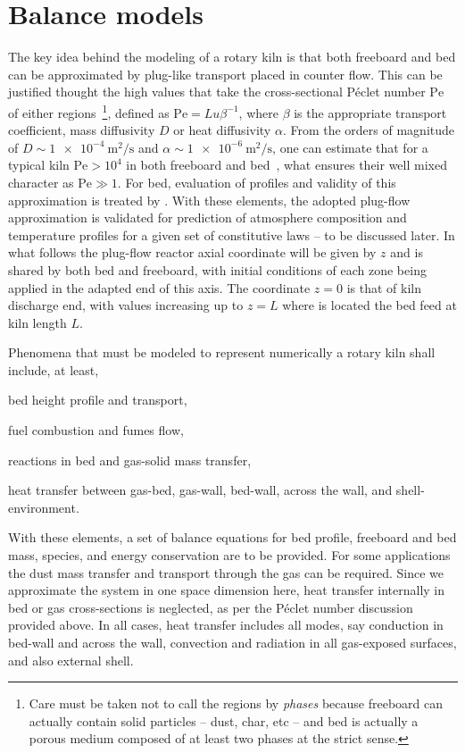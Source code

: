 \documentclass[11pt]{paper}
\begin{document}
\section{Balance models}

The key idea behind the modeling of a rotary kiln is that both freeboard and bed can be approximated by plug-like transport placed in counter flow. This can be justified thought the high values that take the cross-sectional Péclet number $\mathrm{Pe}$ of either regions~\footnote{Care must be taken not to call the regions by \emph{phases} because freeboard can actually contain solid particles -- dust, char, etc -- and bed is actually a porous medium composed of at least two phases at the strict sense.}, defined as $\mathrm{Pe}=Lu\beta^{-1}$, where $\beta$ is the appropriate transport coefficient, mass diffusivity $D$ or heat diffusivity $\alpha$. From the orders of magnitude of $D\sim{}\SI{1e-4}{\square\meter\per\second}$ and $\alpha\sim{}\SI{1e-6}{\square\meter\per\second}$, one can estimate that for a typical kiln $\mathrm{Pe}>10^4$ in both freeboard and bed~\cite{Mujumdar2006i,Mujumdar2006ii}, what ensures their well mixed character as $\mathrm{Pe}\gg{1}$. For bed, evaluation of profiles and validity of this approximation is treated by \textcite{Liu2016}. With these elements, the adopted plug-flow approximation is validated for prediction of atmosphere composition and temperature profiles for a given set of constitutive laws -- to be discussed later.  In what follows the plug-flow reactor axial coordinate will be given by $z$ and is shared by both bed and freeboard, with initial conditions of each zone being applied in the adapted end of this axis. The coordinate $z=0$ is that of kiln discharge end, with values increasing up to $z=L$ where is located the bed feed at kiln length $L$.

Phenomena that must be modeled to represent numerically a rotary kiln shall include, at least, \begin{inparaenum}[(i)]
    \item bed height profile and transport,
    \item fuel combustion and fumes flow,
    \item reactions in bed and gas-solid mass transfer,
    \item heat transfer between gas-bed, gas-wall, bed-wall, across the wall, and shell-environment.
\end{inparaenum} With these elements, a set of balance equations for bed profile, freeboard and bed mass, species, and energy conservation are to be provided. For some applications the dust mass transfer and transport through the gas can be required. Since we approximate the system in one space dimension here, heat transfer internally in bed or gas cross-sections is neglected, as per the Péclet number discussion provided above. In all cases, heat transfer includes all modes, say conduction in bed-wall and across the wall, convection and radiation in all gas-exposed surfaces, and also external shell.
\end{document}
